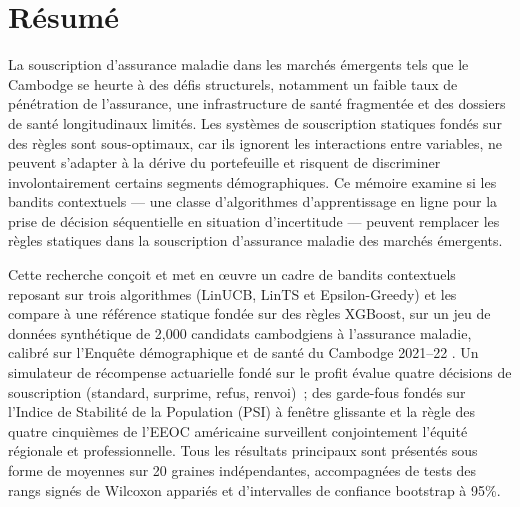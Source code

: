 \chapter*{\centering Résumé}

\hs La souscription d'assurance maladie dans les marchés émergents tels que le Cambodge se heurte à des défis structurels, notamment un faible taux de pénétration de l'assurance, une infrastructure de santé fragmentée et des dossiers de santé longitudinaux limités. Les systèmes de souscription statiques fondés sur des règles sont sous-optimaux, car ils ignorent les interactions entre variables, ne peuvent s'adapter à la dérive du portefeuille et risquent de discriminer involontairement certains segments démographiques. Ce mémoire examine si les bandits contextuels --- une classe d'algorithmes d'apprentissage en ligne pour la prise de décision séquentielle en situation d'incertitude --- peuvent remplacer les règles statiques dans la souscription d'assurance maladie des marchés émergents.

Cette recherche conçoit et met en {\oe}uvre un cadre de bandits contextuels reposant sur trois algorithmes (LinUCB, LinTS et Epsilon-Greedy) et les compare à une référence statique fondée sur des règles XGBoost, sur un jeu de données synthétique de 2{,}000 candidats cambodgiens à l'assurance maladie, calibré sur l'Enquête démographique et de santé du Cambodge 2021--22 \citep{NIS2023}. Un simulateur de récompense actuarielle fondé sur le profit évalue quatre décisions de souscription (standard, surprime, refus, renvoi)~; des garde-fous fondés sur l'Indice de Stabilité de la Population (PSI) à fenêtre glissante et la règle des quatre cinquièmes de l'EEOC américaine surveillent conjointement l'équité régionale et professionnelle. Tous les résultats principaux sont présentés sous forme de moyennes sur 20 graines indépendantes, accompagnées de tests des rangs signés de Wilcoxon appariés et d'intervalles de confiance bootstrap à 95\%.

